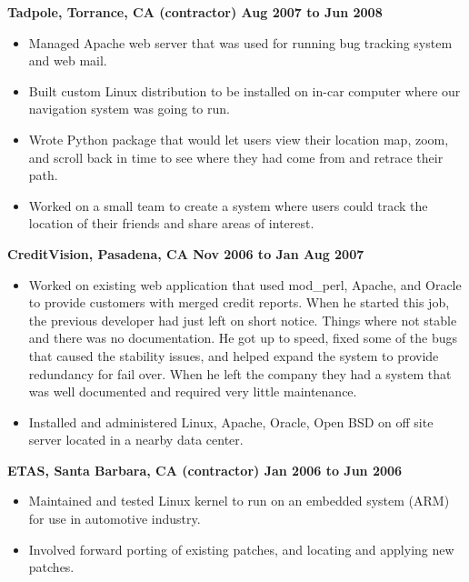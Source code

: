 \documentclass{res}
\begin{document}
\begin{resume}
{\large \bf Tadpole, Torrance, CA (contractor) \hfill Aug 2007 to Jun 2008}
\begin{itemize}

\item Managed Apache web server that was used for running bug
tracking system and web mail.

\item Built custom Linux distribution to be installed on in-car
computer where our navigation system was going to run.

\item Wrote Python package that would let users view their location
map, zoom, and scroll back in time to see where they had come from
and retrace their path.

\item Worked on a small team to create a system where users could
track the location of their friends and share areas of interest.

\end{itemize}

{\large \bf CreditVision, Pasadena, CA \hfill Nov 2006 to Jan Aug 2007}
\begin{itemize}

\item Worked on existing web application that used mod\_perl, Apache,
and Oracle to provide customers with merged credit reports.  When he
started this job, the previous developer had just left on short notice.
Things where not stable and there was no documentation.  He got up to
speed, fixed some of the bugs that caused the stability issues, and
helped expand the system to provide redundancy for fail over.  When he
left the company they had a system that was well documented and required
very little maintenance.

\item Installed and administered Linux, Apache, Oracle, Open BSD on off
site server located in a nearby data center.

\end{itemize}

{\large \bf ETAS, Santa Barbara, CA (contractor) \hfill Jan 2006 to Jun 2006}
\begin{itemize}

\item Maintained and tested Linux kernel to run on an embedded system
(ARM) for use in automotive industry.

\item Involved forward porting of existing patches, and locating and
applying new patches.


\end{itemize}
\end{resume}
\end{document}
